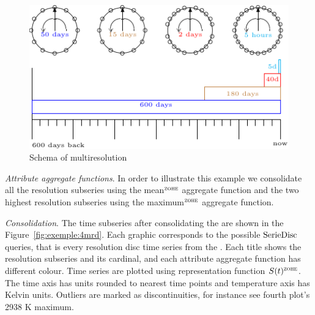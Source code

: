 \begin{figure}[tp]
  \centering
  \setlength{\unitlength}{1.3mm}
  \includegraphics{fig_exemple_window.pdf}
  \caption{Schema of multiresolution}
  \label{fig:exemple:window}
\end{figure}

\emph{Attribute aggregate functions}.  In order to illustrate this
example we consolidate all the resolution subseries using the
mean$^\zohe{}$ aggregate function and the two highest resolution
subseries using the maximum$^\zohe{}$ aggregate function. 



\emph{Consolidation}. The time subseries after consolidating the
 are shown in the Figure~\ref{fig:exemple:4mrd}. 
Each graphic corresponds to the possible $\operatorname{SerieDisc}$ queries, that is
every resolution disc time series from the . Each title
shows the resolution subseries and its cardinal, and each attribute
aggregate function has different colour.  
%
Time series are plotted using \zohe{} representation function
$S(t)^\zohe{}$. The time axis has  units rounded to nearest
time points and temperature axis has Kelvin units. Outliers are
marked as discontinuities, for instance see fourth plot's 2938 K
maximum.

